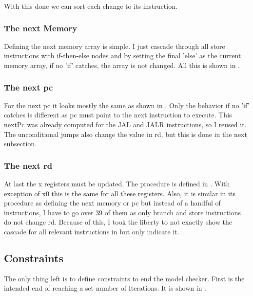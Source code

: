 With this done we can sort each change to its instruction.



\subsubsection{The next Memory}
Defining the next memory array is simple. I just cascade through all
store instructions with if-then-else nodes and by setting the final
'else' as the current memory array, if no 'if' catches, the array is
not changed. All this is shown in .



\subsubsection{The next pc}
For the next pc it looks mostly the same as shown in
. Only the behavior if no 'if' catches is
different as pc must point to the next instruction to execute. This
nextPc was already computed for the JAL and JALR instructions, so I
reused it. The unconditional jumps also change the value in rd, but
this is done in the next subsection.



\subsubsection{The next rd}
At last the x registers must be updated. The procedure is defined in
. With exception of x0 this is the same for all
these registers. Also, it is similar in its procedure as defining the
next memory or pc but instead of a handful of instructions, I have to
go over 39 of them as only branch and store instructions do not
change rd. Because of this, I took the liberty to not exactly show
the cascade for all relevant instructions in  but
only indicate it.



\subsection{Constraints}
The only thing left is to define constraints to end the model
checker. First is the intended end of reaching a set number of
Iterations. It is shown in .

